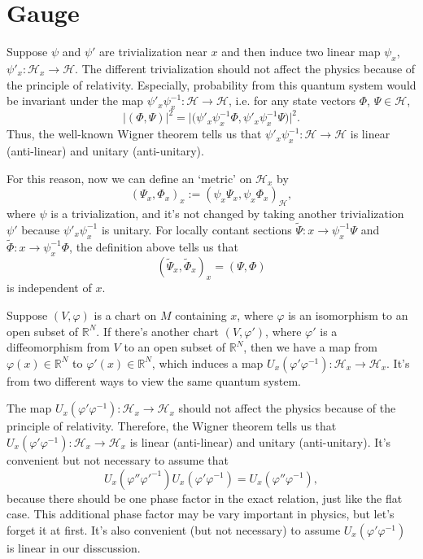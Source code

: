 \documentclass[12pt]{extarticle}
\theoremstyle{definition}
\theoremstyle{plain}
\begin{document}
\section{Gauge}

Suppose $\psi$ and $\psi'$ are trivialization near $x$ and then induce two linear map $\psi_x$, $\psi'_x:\mathcal H_x\to \mathcal H$. The different trivialization should not affect the physics because of the principle of relativity. Especially, probability from this quantum system would be invariant under the map $\psi'_x\psi^{-1}_x:\mathcal H\to \mathcal H$, i.e. for any state vectors $\Phi$, $\Psi\in \mathcal H$,
\[
	|(\Phi,\Psi)|^2=\bigl|\bigl(\psi'_x\psi^{-1}_x\Phi,\psi'_x\psi^{-1}_x\Psi\bigr)\bigr|^2.
\]
Thus, the well-known Wigner theorem tells us that $\psi'_x\psi^{-1}_x:\mathcal H\to \mathcal H$ is linear (anti-linear) and unitary (anti-unitary). 

For this reason, now we can define an `metric' on $\mathcal H_x$ by
\[
	(\Psi_x,\Phi_x)_x:=\left(\psi_x\Psi_x,\psi_x\Phi_x\right)_{\mathcal H},
\]
where $\psi$ is a trivialization, and it's not changed by taking another trivialization $\psi'$ because $\psi'_x\psi^{-1}_x$ is unitary. For locally contant sections $\widetilde \Psi:x\to \psi_x^{-1}\Psi$ and $\widetilde \Phi:x\to \psi_x^{-1}\Phi$, the definition above tells us that
\[
	(\widetilde \Psi_x,\widetilde \Phi_x)_x=(\Psi,\Phi)
\]
is independent of $x$.

Suppose $(V,\varphi)$ is a chart on $M$ containing $x$, where $\varphi$ is an isomorphism to an open subset of $\mathbb R^{N}$. If there's another chart $(V,\varphi')$, where $\varphi'$ is a diffeomorphism from $V$ to an open subset of $\mathbb R^{N}$, then we have a map from $\varphi(x)\in \mathbb R^N$ to $\varphi'(x)\in \mathbb R^N$, which induces a map $U_x(\varphi'\varphi^{-1}):\mathcal H_x\to \mathcal H_x$. It's from two different ways to view the same quantum system.

The map $U_x(\varphi'\varphi^{-1}):\mathcal H_x\to \mathcal H_x$ should not affect the physics because of the principle of relativity. Therefore, the Wigner theorem tells us that $U_x(\varphi'\varphi^{-1}):\mathcal H_x\to \mathcal H_x$ is linear (anti-linear) and unitary (anti-unitary). It's convenient but not necessary to assume that 
\[
	U_x(\varphi''\varphi'^{-1})U_x(\varphi'\varphi^{-1})=U_x(\varphi''\varphi^{-1}),
\] 
because there should be one phase factor in the exact relation, just like the flat case. This additional phase factor may be vary important in physics, but let's forget it at first. It's also convenient (but not necessary) to assume $U_x(\varphi'\varphi^{-1})$ is linear in our disscussion.
\end{document}
